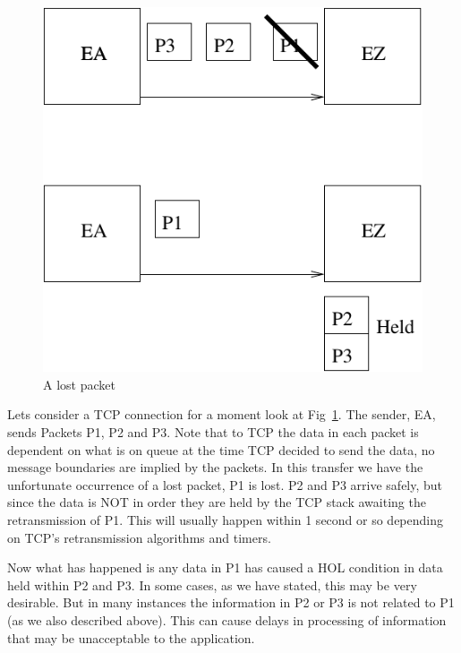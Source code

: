 \documentclass[conference]{IEEEtran}
\begin{document}
\begin{figure}
\includegraphics{lostpacket}
\caption{A lost packet}
\label{lost}
\end{figure}

Lets consider a TCP connection for a moment look at Fig~\ref{lost}. 
The sender, EA, sends Packets P1, P2 and P3. Note that to TCP the data
in each packet is dependent on what is on queue at the time TCP decided
to send the data, no message boundaries are implied by the packets. In this
transfer we have the unfortunate occurrence of a lost packet, P1 is lost. P2 and P3
arrive safely, but since the data is NOT in order they are held by the TCP stack
awaiting the retransmission of P1. This will usually happen within 1 second or so
depending on TCP's retransmission algorithms and timers.

Now what has happened is any data in P1 has caused a HOL condition in data
held within P2 and P3. In some cases, as we have stated, this may be very desirable.
But in many instances the information in P2 or P3 is not related to P1 (as we also
described above). This can cause delays in processing of information that may
be unacceptable to the application.
\end{document}
